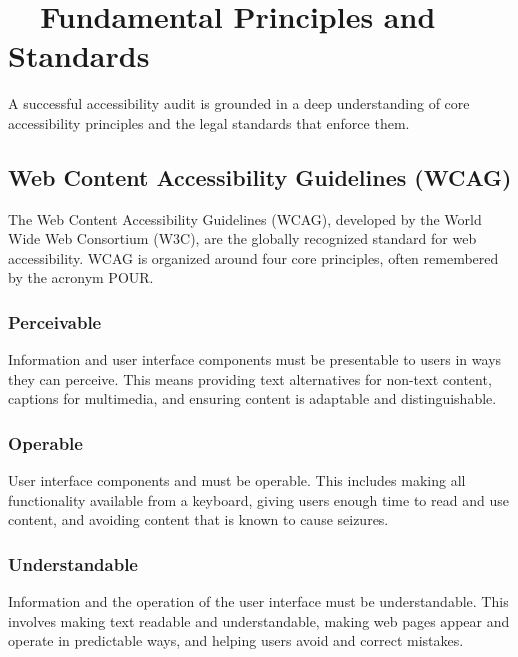 \section{~~Fundamental Principles and Standards}
\label{sec:principles-standards}
A successful accessibility audit is grounded in a deep understanding of core accessibility principles and the legal standards that enforce them.

\subsection{Web Content Accessibility Guidelines (WCAG)}
\label{subsec:wcag}
The Web Content Accessibility Guidelines (WCAG), developed by the World Wide Web Consortium (W3C), are the globally recognized standard for web accessibility. WCAG is organized around four core principles, often remembered by the acronym POUR.
\supercite{WCAG21, WCAG2018}

\subsubsection{Perceivable}
\label{ssubsec:perceivable}
Information and user interface components must be presentable to users in ways they can perceive. This means providing text alternatives for non-text content, captions for multimedia, and ensuring content is adaptable and distinguishable.
\supercite{WCAGNonText2018}

\subsubsection{Operable}
\label{ssubsec:operable}
User interface components and  must be operable. This includes making all functionality available from a keyboard, giving users enough time to read and use content, and avoiding content that is known to cause seizures.
\supercite{WebAIMKeyboardA11y}

\subsubsection{Understandable}
\label{ssubsec:understandable}
Information and the operation of the user interface must be understandable. This involves making text readable and understandable, making web pages appear and operate in predictable ways, and helping users avoid and correct mistakes.
\supercite{Redish2012}

